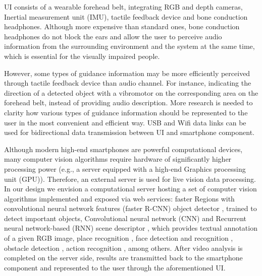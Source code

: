 \documentclass[10pt,conference,compsocconf]{IEEEtran}
\begin{document}

UI consists of a wearable forehead belt, integrating RGB and depth cameras, Inertial measurement unit (IMU), tactile feedback device and bone conduction headphones. Although more expensive than standard ones, bone conduction headphones do not block the ears and allow the user to perceive audio information from the surrounding environment and the system at the same time, which is essential for the visually impaired people. 


However, some types of guidance information may be more efficiently perceived through tactile feedback device than audio channel. For instance, indicating the direction of a detected object with a vibromotor on the corresponding area on the forehead belt, instead of providing audio description. More research is needed to clarity how various types of guidance information should be represented to the user in the most convenient and efficient way. USB and Wifi data links can be used for bidirectional data transmission between UI and smartphone component.


Although modern high-end smartphones are powerful computational devices, many computer vision algorithms  require hardware of significantly higher processing power (e.g., a server equipped with a high-end Graphics processing unit (GPU)). Therefore, an external server is used for live vision data processing. In our design we envision a computational server hosting a set of computer vision algorithms implemented and exposed via web services: faster Regions with convolutional neural network features (faster R-CNN) object detector \cite{Ren}, trained to detect important objects, Convolutional neural network (CNN) and Recurrent neural network-based (RNN) scene descriptor \cite{Liu}, which provides textual annotation of a given RGB image, place recognition \cite{Ohn-Bar}, face detection and recognition \cite{Amos}, obstacle detection \cite{Laina}, action recognition \cite{Valor}, among others. After video analysis is completed on the server side, results are transmitted back to the smartphone component and represented to the user through the aforementioned UI.
\end{document}
